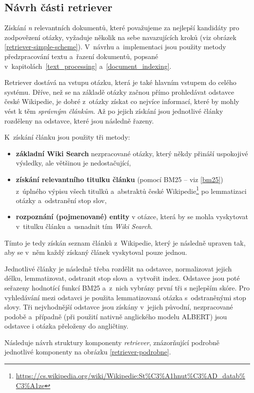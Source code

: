 \subsection{Návrh části retriever}
Získání \emph{n} relevantních dokumentů, které považujeme za nejlepší kandidáty pro zodpovězení otázky, vyžaduje několik na sebe navazujících kroků (viz obrázek \ref{retriever-simple-scheme}). V~návrhu a~implementaci jsou použity metody předzpracování textu a~řazení dokumentů, popsané v~kapitolách~\ref{text_processing} a~\ref{document_indexing}.\par
Retriever dostává na vstupu otázku, která je také hlavním vstupem do celého systému. Dříve, než se na základě otázky začnou přímo prohledávat odstavce české Wikipedie, je dobré z~otázky získat co nejvíce informací, které by mohly vést k těm \emph{správným článkům}. Až po jejich získání jsou jednotlivé články rozděleny na odstavce, které jsou následně řazeny.\par
\noindent K~získání článku jsou použity tři metody:
\begin{itemize}
    \item \textbf{základní Wiki Search} nezpracované otázky, který někdy přináší uspokojivé výsledky, ale většinou je nedostačující,
    \item \textbf{získání relevantního titulku článku} (pomocí BM25 -- viz \ref{bm25}) z~úplného výpisu všech titulků a~abstraktů české Wikipedie\footnote{\url{https://cs.wikipedia.org/wiki/Wikipedie:St\%C3\%A1hnut\%C3\%AD_datab\%C3\%A1ze}} po lemmatizaci otázky a~odstranění stop slov,
    \item \textbf{rozpoznání (pojmenované) entity} v otázce, která by se mohla vyskytovat v~titulku článku a~usnadnit tím \emph{Wiki Search}.
\end{itemize}
Tímto je tedy získán seznam článků z~Wikipedie, který je následně upraven tak, aby se v~něm každý získaný článek vyskytoval pouze jednou.\par
Jednotlivé články je následně třeba rozdělit na odstavce, normalizovat jejich délku, lemmatizovat, odstranit stop slova a~vytvořit index. Odstavce jsou poté seřazeny hodnotící funkcí BM25 a~z~nich vybrány první tři s nejlepším skóre. Pro vyhledávání mezi odstavci je použita lemmatizovaná otázka s~odstraněnými stop slovy. Tři nejvhodnější odstavce jsou získány v~jejich původní, nezpracované podobě a~případně (při použití nativně anglického modelu ALBERT) jsou odstavce i otázka přeloženy do angličtiny.\par
Následuje návrh struktury komponenty \emph{retriever}, znázorňující podrobně jednotlivé komponenty na obrázku \ref{retriever-podrobne}.

